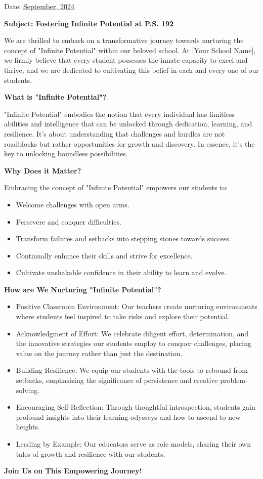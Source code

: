 \documentclass[12pt,letterpaper]{article}
\begin{document}
\vspace*{0.5in}
Date: \href{https://www.ps192.org/apps/bbmessages/show_bbm.jsp?REC_ID=139439}{September, 2024} 

\textbf{Subject: Fostering Infinite Potential at P.S. 192}

We are thrilled to embark on a transformative journey towards nurturing the concept of "Infinite Potential" within our beloved school. At [Your School Name], we firmly believe that every student possesses the innate capacity to excel and thrive, and we are dedicated to cultivating this belief in each and every one of our students.

\textbf{What is "Infinite Potential"?}

"Infinite Potential" embodies the notion that every individual has limitless abilities and intelligence that can be unlocked through dedication, learning, and resilience. It's about understanding that challenges and hurdles are not roadblocks but rather opportunities for growth and discovery. In essence, it's the key to unlocking boundless possibilities.

\textbf{Why Does it Matter?}

Embracing the concept of "Infinite Potential" empowers our students to:
\begin{itemize}
	\item Welcome challenges with open arms.
    \item Persevere and conquer difficulties.
    \item Transform failures and setbacks into stepping stones towards success.
    \item Continually enhance their skills and strive for excellence.
    \item Cultivate unshakable confidence in their ability to learn and evolve.
\end{itemize}
\textbf{How are We Nurturing "Infinite Potential"?}
\begin{itemize}
	\item Positive Classroom Environment: Our teachers create nurturing environments where students feel inspired to take risks and explore their potential.
	\item Acknowledgment of Effort: We celebrate diligent effort, determination, and the innovative strategies our students employ to conquer challenges, placing value on the journey rather than just the destination.
	\item Building Resilience: We equip our students with the tools to rebound from setbacks, emphasizing the significance of persistence and creative problem-solving.
\pagebreak
\vspace*{1.5cm}
	\item Encouraging Self-Reflection: Through thoughtful introspection, students gain profound insights into their learning odysseys and how to ascend to new heights.
	\item Leading by Example: Our educators serve as role models, sharing their own tales of growth and resilience with our students.
\end{itemize}
\textbf{Join Us on This Empowering Journey!}
\end{document}

